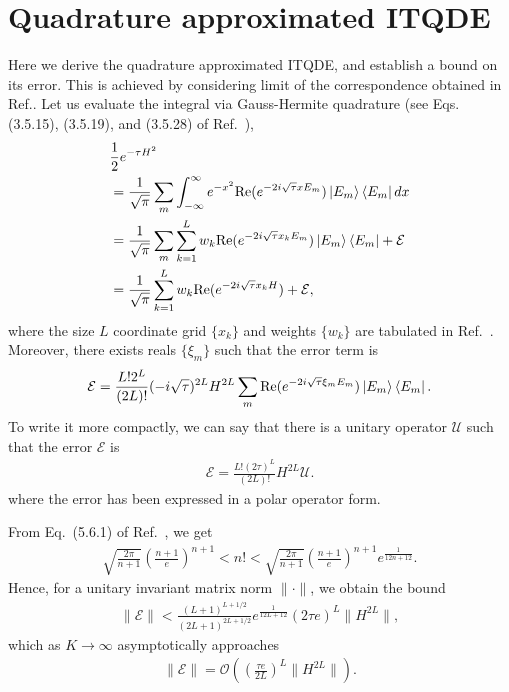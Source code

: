 \documentclass[reprint, aps,prx,showpacs,bibfootnote,preprintnumbers, mathtools, superscriptaddress, amsmath,amssymb]{revtex4-2}
\begin{document}
\section{Quadrature approximated ITQDE}\label{app:quad_approx}
Here we derive the quadrature approximated ITQDE, and establish a bound on its error. This is achieved by considering limit of the correspondence obtained in Ref.\cite{leamer_quantum_2024}. Let us evaluate the integral via Gauss-Hermite quadrature (see Eqs. (3.5.15), (3.5.19), and (3.5.28) of Ref.~\cite{NIST:DLMF}),
\begin{align}
    & \frac{1}{2}e^{-\tau H^2} \notag\\
    & = \frac{1}{\sqrt{\pi}} \sum_m \int_{-\infty}^{\infty} e^{-x^2} \mathrm{Re}(e^{-2i\sqrt{\tau}x E_m}) \ket{E_m}\bra{E_m} dx \notag\\
    & = \frac{1}{\sqrt{\pi}} \sum_m \sum_{k=1}^L w_k \mathrm{Re}(e^{-2i\sqrt{\tau}x_k E_m}) \ket{E_m}\bra{E_m} + {\mathcal{E}} \notag\\
    & = \frac{1}{\sqrt{\pi}} \sum_{k=1}^L w_k \mathrm{Re}(e^{-2i\sqrt{\tau}x_k H}) + {\mathcal{E}},
\end{align}
where the size $L$ coordinate grid $\{x_k\}$ and weights $\{ w_k \}$ are tabulated in Ref.~\cite{NIST:DLMF}. Moreover, there exists reals $\{ \xi_m \}$ such that the error term is
\begin{align}
    {\mathcal{E}} = \frac{L! 2^L}{(2L)!} (-i\sqrt{\tau})^{2L} H^{2L} \sum_{m}   \mathrm{Re}(e^{-2i\sqrt{\tau} \xi_m E_m}) \ket{E_m}\bra{E_m}. \notag
\end{align}
To write it more compactly, we can say that there is a unitary operator ${\mathcal{U}}$ such that the error ${\mathcal{E}}$ is
\begin{align}
    {\mathcal{E}} = \frac{L! (2\tau)^L}{(2L)!} H^{2L}  {\mathcal{U}}.
\end{align}
where the error has been expressed in a polar operator form.

From Eq.~(5.6.1) of Ref.~\cite{NIST:DLMF}, we get
\begin{align}
    \sqrt{\frac{2\pi}{n+1}} \left(\frac{n + 1}{e}\right)^{n+1} < n!
    < \sqrt{\frac{2\pi}{n+1}} \left(\frac{n + 1}{e}\right)^{n+1} e^{\frac{1}{12n + 12}}.
\end{align}
Hence, for a unitary invariant matrix norm $\| \cdot \|$, we obtain the bound
\begin{align}
    \| {\mathcal{E}} \| < \frac{(L + 1)^{L+ 1/2}}{(2L + 1)^{2L + 1/2}}e^{\frac{1}{12L + 12}} (2\tau e)^L \| H^{2L} \|,
\end{align}
which as $K \to \infty$ asymptotically approaches
\begin{align}
    \| {\mathcal{E}} \| = \mathcal{O}\left( \left(\frac{\tau e}{2L}\right)^L \| H^{2L} \| \right).
\end{align}
\end{document}
